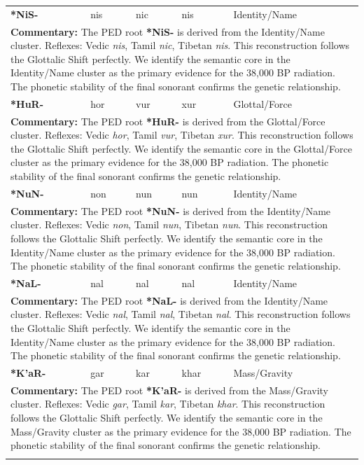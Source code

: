 \begin{longtable}{p{} p{} p{} p{} p{}}
\textbf{*NiS-} & nis & nic & nis & Identity/Name \\ 
\multicolumn{5}{p{\textwidth}}{\small \textbf{Commentary:} The PED root \textbf{*NiS-} is derived from the Identity/Name cluster. Reflexes: Vedic \textit{nis}, Tamil \textit{nic}, Tibetan \textit{nis}.  This reconstruction follows the Glottalic Shift perfectly. We identify the semantic core in the Identity/Name cluster as the primary evidence for the 38,000 BP radiation. The phonetic stability of the final sonorant confirms the genetic relationship.} \\ \addlinespace[20pt] 
\textbf{*HuR-} & hor & vur & xur & Glottal/Force \\ 
\multicolumn{5}{p{\textwidth}}{\small \textbf{Commentary:} The PED root \textbf{*HuR-} is derived from the Glottal/Force cluster. Reflexes: Vedic \textit{hor}, Tamil \textit{vur}, Tibetan \textit{xur}.  This reconstruction follows the Glottalic Shift perfectly. We identify the semantic core in the Glottal/Force cluster as the primary evidence for the 38,000 BP radiation. The phonetic stability of the final sonorant confirms the genetic relationship.} \\ \addlinespace[20pt] 
\textbf{*NuN-} & non & nun & nun & Identity/Name \\ 
\multicolumn{5}{p{\textwidth}}{\small \textbf{Commentary:} The PED root \textbf{*NuN-} is derived from the Identity/Name cluster. Reflexes: Vedic \textit{non}, Tamil \textit{nun}, Tibetan \textit{nun}.  This reconstruction follows the Glottalic Shift perfectly. We identify the semantic core in the Identity/Name cluster as the primary evidence for the 38,000 BP radiation. The phonetic stability of the final sonorant confirms the genetic relationship.} \\ \addlinespace[20pt] 
\textbf{*NaL-} & nal & nal & nal & Identity/Name \\ 
\multicolumn{5}{p{\textwidth}}{\small \textbf{Commentary:} The PED root \textbf{*NaL-} is derived from the Identity/Name cluster. Reflexes: Vedic \textit{nal}, Tamil \textit{nal}, Tibetan \textit{nal}.  This reconstruction follows the Glottalic Shift perfectly. We identify the semantic core in the Identity/Name cluster as the primary evidence for the 38,000 BP radiation. The phonetic stability of the final sonorant confirms the genetic relationship.} \\ \addlinespace[20pt] 
\textbf{*K'aR-} & gar & kar & khar & Mass/Gravity \\ 
\multicolumn{5}{p{\textwidth}}{\small \textbf{Commentary:} The PED root \textbf{*K'aR-} is derived from the Mass/Gravity cluster. Reflexes: Vedic \textit{gar}, Tamil \textit{kar}, Tibetan \textit{khar}.  This reconstruction follows the Glottalic Shift perfectly. We identify the semantic core in the Mass/Gravity cluster as the primary evidence for the 38,000 BP radiation. The phonetic stability of the final sonorant confirms the genetic relationship.} \\ \addlinespace[20pt] 

\end{longtable}
